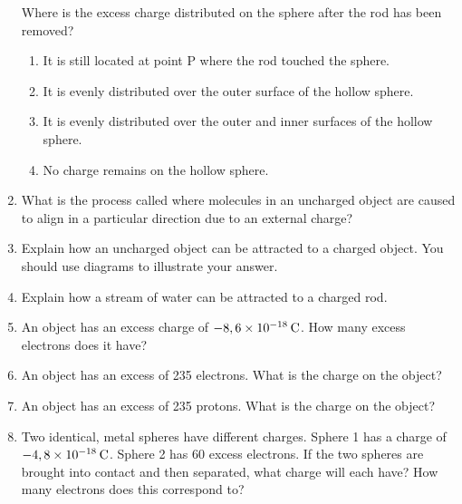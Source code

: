 \begin{enumerate}[noitemsep, label=\textbf{\arabic*}. ]
\begin{figure}[H]
\begin{center}
      \vspace{2pt}
    \vspace{.1in}
    \end{center}
 \end{figure}       
Where is the excess charge distributed on the sphere after the rod
has been removed?
\label{m38781*id202325}\begin{enumerate}[noitemsep, label=\textbf{\alph*}. ] 
            \label{m38781*uid38}\item It is still located at point P where the rod touched the sphere.
\label{m38781*uid39}\item It is evenly distributed over the outer surface of the hollow sphere.
\label{m38781*uid40}\item It is evenly distributed over the outer and inner surfaces of the hollow sphere.
\label{m38781*uid41}\item No charge remains on the hollow sphere.
\end{enumerate}
        \newline
            \label{m38781*uid42}\item What is the process called where molecules in an uncharged object are caused to align in a particular direction due to an external charge?\newline
\label{m38781*uid43}\item Explain how an uncharged object can be attracted to a charged object. You should use diagrams to illustrate your answer.\newline
\label{m38781*uid44}\item Explain how a stream of water can be attracted to a charged rod.\newline
\item An object has an excess charge of 
$-8,6\ensuremath{\times}{10}^{-18}\phantom{\rule{2pt}{0ex}}\mathrm{C}$. How many excess electrons does it have?\newline
            \item An object has an excess of 235 electrons. What is the charge on the object?\newline
            \item An object has an excess of 235 protons. What is the charge on the object?\newline
            \item Two identical, metal spheres have different charges. Sphere 1 has a charge of 
$-4,8\ensuremath{\times}{10}^{-18}\phantom{\rule{2pt}{0ex}}\mathrm{C}$. Sphere 2 has 60 excess electrons. If the two spheres are brought into contact and then separated, what charge will each have? How many electrons does this correspond to?\newline

\end{enumerate}
